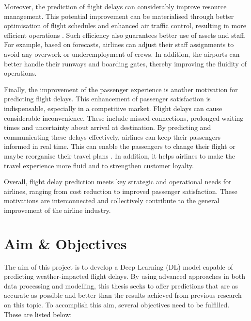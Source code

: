 \documentclass[12pt,oneside]{book} %
\begin{document}
\noindent Moreover, the prediction of flight delays can considerably improve resource management. This potential improvement can be materialised through better optimisation of flight schedules and enhanced air traffic control, resulting in more efficient operations \citep{MAmdouh,Hatipoglu2024}. Such efficiency also guarantees better use of assets and staff. For example, based on forecasts, airlines can adjust their staff assignments to avoid any overwork or underemployment of crews. In addition, the airports can better handle their runways and boarding gates, thereby improving the fluidity of operations.

\noindent Finally, the improvement of the passenger experience is another motivation for predicting flight delays. This enhancement of passenger satisfaction is indispensable, especially in a competitive market. Flight delays can cause considerable inconvenience. These include missed connections, prolonged waiting times and uncertainty about arrival at destination. By predicting and communicating these delays effectively, airlines can keep their passengers informed in real time. This can enable the passengers to change their flight or maybe reorganise their travel plans \citep{Song2020,Efthymiou2019}. In addition, it helps airlines to make the travel experience more fluid and to strengthen customer loyalty.

\noindent Overall, flight delay prediction meets key strategic and operational needs for airlines, ranging from cost reduction to improved passenger satisfaction. These motivations are interconnected and collectively contribute to the general improvement of the airline industry.

\section{Aim \& Objectives}

\noindent The aim of this project is to develop a Deep Learning (DL) model capable of predicting weather-impacted flight delays. By using advanced approaches in both data processing and modelling, this thesis seeks to offer predictions that are as accurate as possible and better than the results achieved from previous research on this topic. To accomplish this aim, several objectives need to be fulfilled. These are listed below: 
\end{document}

